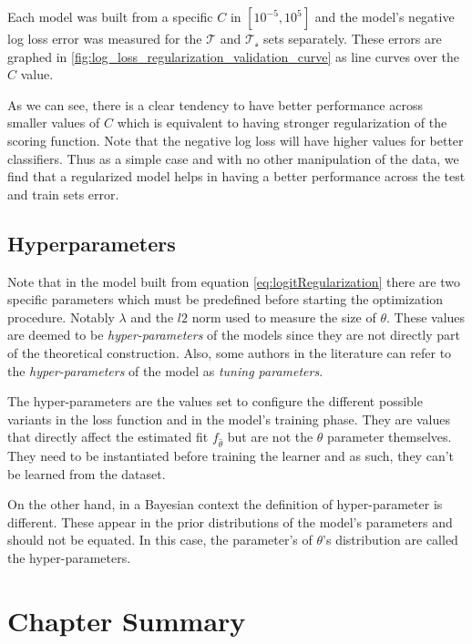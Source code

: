 Each model was built from a specific $C$ in  $[10^{-5},10^5]$  and the model's negative log loss error was measured for the $\mathcal{T}$ and $\mathcal{T_s}$ sets separately. These errors are graphed in \cref{fig:log_loss_regularization_validation_curve} as line curves over the $C$ value.

As we can see, there is a clear tendency to have better performance across smaller values of $C$ which is equivalent to having stronger regularization of the scoring function. Note that the negative log loss will have higher values for better classifiers. Thus as a simple case and with no other manipulation of the data, we find that a regularized model helps in having a better performance across the test and train sets error.



\subsection{Hyperparameters}



Note that in the model built from equation \cref{eq:logitRegularization} there are two specific parameters which must be predefined before starting the optimization procedure. Notably $\lambda$ and the $l2$ norm used to measure the size of $\theta$. These values are deemed to be \textit{hyper-parameters} of the models since they are not directly part of the theoretical construction. Also, some authors in the literature can refer to the \textit{hyper-parameters} of the model as \textit{tuning parameters}.

The hyper-parameters are the values set to configure the different possible variants in the loss function and in the model's training phase. They are values that directly affect the estimated fit $f_{\hat{\theta}}$ but are not the $\theta$ parameter themselves. They need to be instantiated before training the learner and as such, they can't be learned from the dataset.

On the other hand, in a Bayesian context the definition of hyper-parameter is different. These appear in the prior distributions of the model's parameters and should not be equated. In this case, the parameter's of $\theta$'s distribution are called the hyper-parameters.




\section{Chapter Summary}\label{section-ch_machine_learning_summary}

